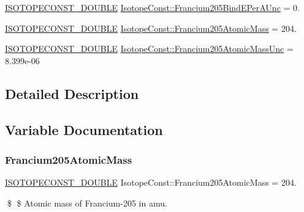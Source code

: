 \begin{DoxyCompactItemize}
\mbox{\hyperlink{group___isotope_const-_macros_ga8f45a7272ce02c0b4c65c44636ed719a}{I\+S\+O\+T\+O\+P\+E\+C\+O\+N\+S\+T\+\_\+\+D\+O\+U\+B\+LE}} \mbox{\hyperlink{group___isotope_const-_francium-_fr205_ga26ad95e63226442fd85ab4e99a7100e8}{Isotope\+Const\+::\+Francium205\+Bind\+E\+Per\+A\+Unc}} = 0.
\item 
\mbox{\hyperlink{group___isotope_const-_macros_ga8f45a7272ce02c0b4c65c44636ed719a}{I\+S\+O\+T\+O\+P\+E\+C\+O\+N\+S\+T\+\_\+\+D\+O\+U\+B\+LE}} \mbox{\hyperlink{group___isotope_const-_francium-_fr205_ga8163a92a6282ee57d0e545fc239378f7}{Isotope\+Const\+::\+Francium205\+Atomic\+Mass}} = 204.
\item 
\mbox{\hyperlink{group___isotope_const-_macros_ga8f45a7272ce02c0b4c65c44636ed719a}{I\+S\+O\+T\+O\+P\+E\+C\+O\+N\+S\+T\+\_\+\+D\+O\+U\+B\+LE}} \mbox{\hyperlink{group___isotope_const-_francium-_fr205_ga9d26919e65be9ef17a97a88b34653c61}{Isotope\+Const\+::\+Francium205\+Atomic\+Mass\+Unc}} = 8.\+399e-\/06
\end{DoxyCompactItemize}


\subsection{Detailed Description}


\subsection{Variable Documentation}
\mbox{\label{group___isotope_const-_francium-_fr205_ga8163a92a6282ee57d0e545fc239378f7}} 
\subsubsection{\texorpdfstring{Francium205\+Atomic\+Mass}{Francium205AtomicMass}}
{\footnotesize\ttfamily \mbox{\hyperlink{group___isotope_const-_macros_ga8f45a7272ce02c0b4c65c44636ed719a}{I\+S\+O\+T\+O\+P\+E\+C\+O\+N\+S\+T\+\_\+\+D\+O\+U\+B\+LE}} Isotope\+Const\+::\+Francium205\+Atomic\+Mass = 204.}

\$ \$ Atomic mass of Francium-\/205 in amu. \mbox{\label{group___isotope_const-_francium-_fr205_ga9d26919e65be9ef17a97a88b34653c61}} 
